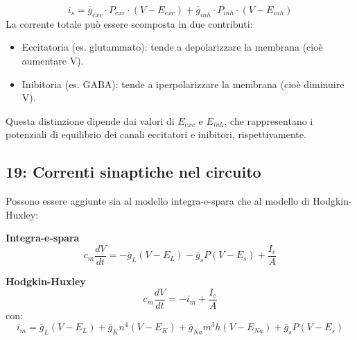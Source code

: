 \[ i_{s} = \overline{g}_{exc} \cdot P_{exc} \cdot (V - E_{exc}) + \overline{g}_{inh} \cdot P_{inh} \cdot (V - E_{inh}) \]
La corrente totale può essere scomposta in due contributi:
\begin{itemize}
    \item Eccitatoria (es. glutammato): tende a depolarizzare la membrana (cioè aumentare V).
    \item Inibitoria (es. GABA): tende a iperpolarizzare la membrana (cioè diminuire V).
\end{itemize}
Questa distinzione dipende dai valori di $E_{exc}$ e $E_{inh}$, che rappresentano i potenziali di equilibrio dei canali eccitatori e inibitori, rispettivamente.


\subsection*{ 19: Correnti sinaptiche nel circuito}

Possono essere aggiunte sia al modello integra-e-spara che al modello di Hodgkin-Huxley:

\textbf{Integra-e-spara}
\[ c_{m} \frac{dV}{dt} = -\overline{g}_{L}(V - E_{L}) - \overline{g}_{s} P (V - E_{s}) + \frac{I_{e}}{A} \]

\textbf{Hodgkin-Huxley}
\[ c_{m} \frac{dV}{dt} = -i_{m} + \frac{I_{e}}{A} \]
con:
\[ i_{m} = \overline{g}_{L}(V - E_{L}) + \overline{g}_{K} n^{4} (V - E_{K}) + \overline{g}_{Na} m^{3} h (V - E_{Na}) + \overline{g}_{s} P (V - E_{s}) \]

